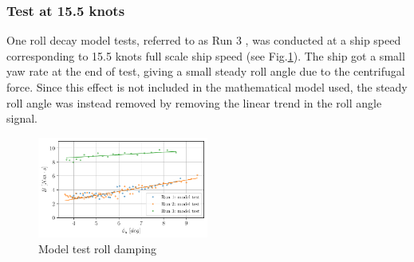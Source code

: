 \subsubsection*{Test at 15.5 knots}\label{test-at-15.5-knots}
One roll decay model tests, referred to as Run 3
\citep{7505983/5DP3HN8F}, was conducted at a ship speed corresponding to
15.5 knots full scale ship speed (see Fig.\ref{fig:mdl}). The
ship got a small yaw rate
at the end of test, giving a small steady roll angle due to the
centrifugal force. Since this effect is not included in the mathematical
model used, the steady roll angle was instead removed by removing the
linear trend in the roll angle signal.
\begin{figure}[H]
\begin{center}\includegraphics[width = 0.5\textwidth]{figures/mdl.pdf}\end{center}
\vspace{-1cm}
\caption{Model test roll damping}
\label{fig:mdl}
\end{figure}
